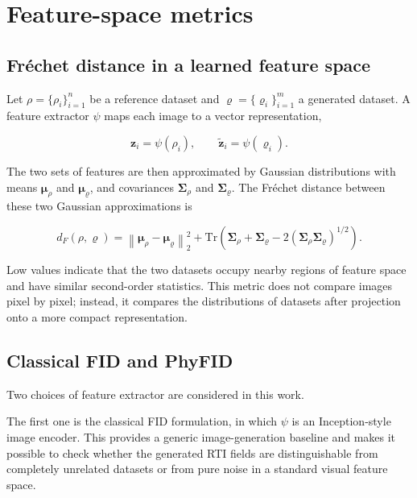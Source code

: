 \section{Feature-space metrics}

\subsection{Fr\'echet distance in a learned feature space}

Let $\rho=\{\rho_i\}_{i=1}^{n}$ be a reference dataset and
$\varrho=\{\varrho_i\}_{i=1}^{m}$ a generated dataset. A feature extractor
$\psi$ maps each image to a vector representation,

\begin{equation}
    \mathbf{z}_i = \psi(\rho_i),
    \qquad
    \widetilde{\mathbf{z}}_i = \psi(\varrho_i).
\end{equation}

The two sets of features are then approximated by Gaussian distributions with
means $\boldsymbol{\mu}_{\rho}$ and $\boldsymbol{\mu}_{\varrho}$, and
covariances $\mathbf{\Sigma}_{\rho}$ and $\mathbf{\Sigma}_{\varrho}$. The
Fr\'echet distance between these two Gaussian approximations is

\begin{equation}
    d_F(\rho,\varrho)
    =
    \left\|
    \boldsymbol{\mu}_{\rho}
    -
    \boldsymbol{\mu}_{\varrho}
    \right\|_2^2
    +
    \mathrm{Tr}\!\left(
        \mathbf{\Sigma}_{\rho}
        +
        \mathbf{\Sigma}_{\varrho}
        -
        2\left(\mathbf{\Sigma}_{\rho}\mathbf{\Sigma}_{\varrho}\right)^{1/2}
    \right).
\end{equation}

Low values indicate that the two datasets occupy nearby regions of feature
space and have similar second-order statistics. This metric does not compare
images pixel by pixel; instead, it compares the distributions of datasets after
projection onto a more compact representation.

\subsection{Classical FID and PhyFID}

Two choices of feature extractor are considered in this work.

The first one is the classical FID formulation, in which $\psi$ is an
Inception-style image encoder. This provides a generic image-generation
baseline and makes it possible to check whether the generated RTI fields are
distinguishable from completely unrelated datasets or from pure noise in a
standard visual feature space.


